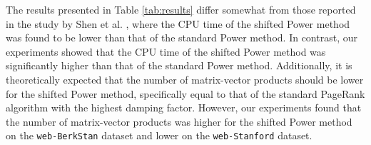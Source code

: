 \noindent The results presented in Table \ref{tab:results} differ somewhat from those reported in the study by Shen et al. \cite{SHEN2022126799}, where the CPU time of the shifted Power method was found to be lower than that of the standard Power method. In contrast, our experiments showed that the CPU time of the shifted Power method was significantly higher than that of the standard Power method. Additionally, it is theoretically expected that the number of matrix-vector products should be lower for the shifted Power method, specifically equal to that of the standard PageRank algorithm with the highest damping factor. However, our experiments found that the number of matrix-vector products was higher for the shifted Power method on the \texttt{web-BerkStan} dataset and lower on the \texttt{web-Stanford} dataset. \vspace*{0.5cm}

